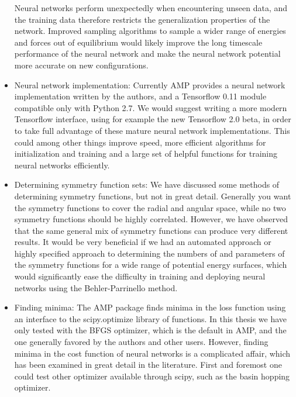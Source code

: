 \begin{itemize}
        Neural networks perform unexpectedly when encountering unseen data,
        and the training data therefore restricts the generalization
        properties of the network. Improved sampling algorithms to
        sample a wider range of energies and forces out of equilibrium
        would likely improve the long timescale performance of the neural
        network and make the neural network potential more accurate on
        new configurations.
    \item Neural network implementation:
        Currently AMP provides a neural network implementation written
        by the authors, and a Tensorflow 0.11 module compatible only
        with Python 2.7. We would suggest writing a more modern Tensorflow
        interface, using for example the new Tensorflow 2.0 beta,
        in order to take full advantage of these mature neural network
        implementations. This could among other things improve speed,
        more efficient algorithms for initialization and training
        and a large set of helpful functions for training neural networks
        efficiently.
    \item Determining symmetry function sets:
        We have discussed some methods of determining symmetry functions,
        but not in great detail. Generally you want the symmetry functions
        to cover the radial and angular space, while no two symmetry functions
        should be highly correlated. However, we have observed that
        the same general mix of symmetry functions can produce very
        different results. It would be very beneficial if we had an automated
        approach or highly specified approach to determining the numbers of
        and parameters of the symmetry functions for a wide range of
        potential energy surfaces, which would significantly ease the difficulty
        in training and deploying neural networks using the Behler-Parrinello
        method.
   \item Finding minima:
        The AMP package finds minima in the loss function using an
        interface to the scipy.optimize library of functions.
        In this thesis we have only tested with the BFGS optimizer,
        which is the default in AMP, and the one generally favored
        by the authors and other users. However, finding minima in the cost
        function of neural networks is a complicated affair, which has
        been examined in great detail in the literature.
        First and foremost one could test other optimizer available
        through scipy, such as the basin hopping optimizer.

\end{itemize}
